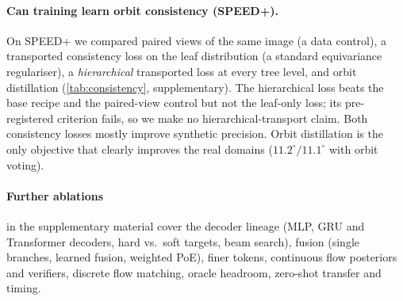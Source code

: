 \paragraph{Can training learn orbit consistency (SPEED+).}
On SPEED+ we compared paired views of the same image (a data control), a transported consistency loss on the leaf distribution (a standard equivariance regulariser), a \emph{hierarchical} transported loss at every tree level, and orbit distillation (\cref{tab:consistency}, supplementary). The hierarchical loss beats the base recipe and the paired-view control but not the leaf-only loss; its pre-registered criterion fails, so we make no hierarchical-transport claim. Both consistency losses mostly improve synthetic precision. Orbit distillation is the only objective that clearly improves the real domains ($11.2^\circ/11.1^\circ$ with orbit voting).

\paragraph{Further ablations} in the supplementary material cover the decoder lineage (MLP, GRU and Transformer decoders, hard vs.\ soft targets, beam search), fusion (single branches, learned fusion, weighted PoE), finer tokens, continuous flow posteriors and verifiers, discrete flow matching, oracle headroom, zero-shot transfer and timing.
